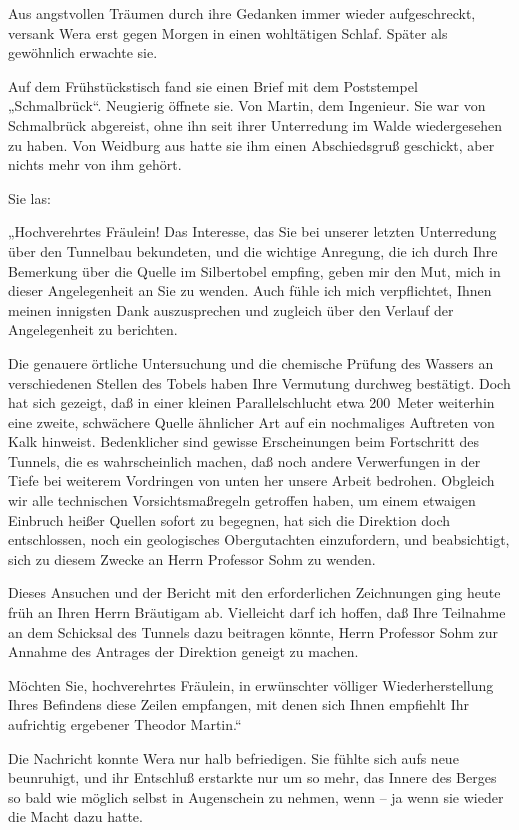 Aus angstvollen Träumen durch ihre Gedanken immer wieder
aufgeschreckt, versank Wera erst gegen Morgen in einen wohltätigen
Schlaf. Später als gewöhnlich erwachte sie.

Auf dem Frühstückstisch fand sie einen Brief mit dem Poststempel
„Schmalbrück“. Neugierig öffnete sie. Von Martin, dem Ingenieur.
Sie war von Schmalbrück abgereist, ohne ihn seit ihrer Unterredung
im Walde wiedergesehen zu haben. Von Weidburg aus hatte sie ihm
einen Abschiedsgruß geschickt, aber nichts mehr von ihm gehört.

Sie las:

„Hochverehrtes Fräulein! Das Interesse, das Sie bei unserer letzten
Unterredung über den Tunnelbau bekundeten, und die wichtige
Anregung, die ich durch Ihre Bemerkung über die Quelle im
Silbertobel empfing, geben mir den Mut, mich in dieser
Angelegenheit an Sie zu wenden. Auch fühle ich mich verpflichtet,
Ihnen meinen innigsten Dank auszusprechen und zugleich über den
Verlauf der Angelegenheit zu berichten.

Die genauere örtliche Untersuchung und die chemische Prüfung des
Wassers an verschiedenen Stellen des Tobels haben Ihre Vermutung
durchweg bestätigt. Doch hat sich gezeigt, daß in einer kleinen
Parallelschlucht etwa 200~Meter weiterhin eine zweite, schwächere
Quelle ähnlicher Art auf ein nochmaliges Auftreten von Kalk
hinweist. Bedenklicher sind gewisse Erscheinungen beim Fortschritt
des Tunnels, die es wahrscheinlich machen, daß noch andere
Verwerfungen in der Tiefe bei weiterem Vordringen von unten her
unsere Arbeit bedrohen. Obgleich wir alle technischen
Vorsichtsmaßregeln getroffen haben, um einem etwaigen Einbruch
heißer Quellen sofort zu begegnen, hat sich die Direktion doch
entschlossen, noch ein geologisches Obergutachten einzufordern, und
beabsichtigt, sich zu diesem Zwecke an Herrn Professor Sohm zu
wenden.

Dieses Ansuchen und der Bericht mit den erforderlichen Zeichnungen
ging heute früh an Ihren Herrn Bräutigam ab. Vielleicht darf ich
hoffen, daß Ihre Teilnahme an dem Schicksal des Tunnels dazu
beitragen könnte, Herrn Professor Sohm zur Annahme des Antrages der
Direktion geneigt zu machen.

Möchten Sie, hochverehrtes Fräulein, in erwünschter völliger
Wiederherstellung Ihres Befindens diese Zeilen empfangen, mit denen
sich Ihnen empfiehlt Ihr aufrichtig ergebener Theodor Martin.“

Die Nachricht konnte Wera nur halb befriedigen. Sie fühlte sich
aufs neue beunruhigt, und ihr Entschluß erstarkte nur um so mehr,
das Innere des Berges so bald wie möglich selbst in Augenschein zu
nehmen, wenn – ja wenn sie wieder die Macht dazu hatte.

